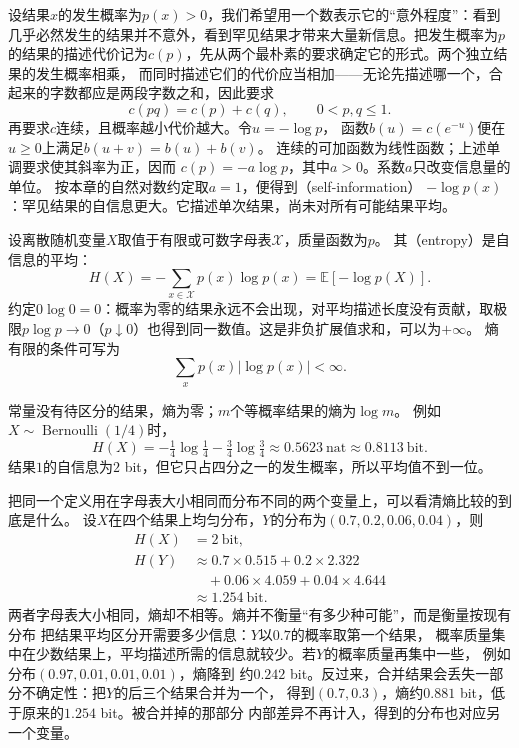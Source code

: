 设结果\(x\)的发生概率为\(p(x)>0\)，我们希望用一个数表示它的“意外程度”：看到几乎必然发生的结果并不意外，看到罕见结果才带来大量新信息。把发生概率为\(p\)的结果的描述代价记为\(c(p)\)，先从两个最朴素的要求确定它的形式。两个独立结果的发生概率相乘，
而同时描述它们的代价应当相加——无论先描述哪一个，合起来的字数都应是两段字数之和，因此要求
\[
  c(pq)=c(p)+c(q),\qquad 0<p,q\leq1.
\]
再要求\(c\)连续，且概率越小代价越大。令\(u=-\log p\)，
函数\(b(u)=c(e^{-u})\)便在\(u\geq0\)上满足\(b(u+v)=b(u)+b(v)\)。
连续的可加函数为线性函数；上述单调要求使其斜率为正，因而
\(c(p)=-a\log p\)，其中\(a>0\)。系数\(a\)只改变信息量的单位。
按本章的自然对数约定取\(a=1\)，便得到（self-information）
\(-\log p(x)\)：罕见结果的自信息更大。它描述单次结果，尚未对所有可能结果平均。

\begin{definition}[离散熵]
\label{def:information-discrete-entropy}
设离散随机变量\(X\)取值于有限或可数字母表\(\mathcal X\)，质量函数为\(p\)。
其（entropy）是自信息的平均：
\begin{equation}
  H(X)=-\sum_{x\in\mathcal X}p(x)\log p(x)
      =\mathbb E[-\log p(X)].
  \label{eq:information-discrete-entropy}
\end{equation}
约定\(0\log0=0\)：概率为零的结果永远不会出现，对平均描述长度没有贡献，取极限\(p\log p\to0\)（\(p\downarrow0\)）也得到同一数值。这是非负扩展值求和，可以为\(+\infty\)。
熵有限的条件可写为
\[
  \sum_xp(x)|\log p(x)|<\infty.
\]
\end{definition}

常量没有待区分的结果，熵为零；\(m\)个等概率结果的熵为\(\log m\)。
例如\(X\sim\operatorname{Bernoulli}(1/4)\)时，
\[
  H(X)=-\tfrac14\log\tfrac14-\tfrac34\log\tfrac34
       \approx0.5623\ \mathrm{nat}\approx0.8113\ \mathrm{bit}.
\]
结果\(1\)的自信息为\(2\) bit，但它只占四分之一的发生概率，所以平均值不到一位。

把同一个定义用在字母表大小相同而分布不同的两个变量上，可以看清熵比较的到底是什么。
设\(X\)在四个结果上均匀分布，\(Y\)的分布为\((0.7,0.2,0.06,0.04)\)，则
\[
\begin{aligned}
  H(X)&=2\ \mathrm{bit},\\
  H(Y)&\approx0.7\times0.515+0.2\times2.322\\
      &\quad+0.06\times4.059+0.04\times4.644\\
      &\approx1.254\ \mathrm{bit}.
\end{aligned}
\]
两者字母表大小相同，熵却不相等。熵并不衡量“有多少种可能”，而是衡量按现有分布
把结果平均区分开需要多少信息：\(Y\)以\(0.7\)的概率取第一个结果，
概率质量集中在少数结果上，平均描述所需的信息就较少。若\(Y\)的概率质量再集中一些，
例如分布\((0.97,0.01,0.01,0.01)\)，熵降到
约\(0.242\) bit。反过来，合并结果会丢失一部分不确定性：把\(Y\)的后三个结果合并为一个，
得到\((0.7,0.3)\)，熵约\(0.881\) bit，低于原来的\(1.254\) bit。被合并掉的那部分
内部差异不再计入，得到的分布也对应另一个变量。

